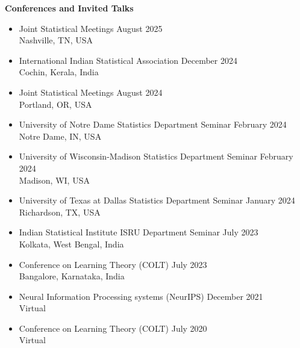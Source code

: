 \documentclass[letterpaper,12pt,oneside]{article}
\theoremstyle{definition}
\begin{document}
			
			\noindent \textbf{Conferences and Invited Talks}
			\begin{itemize}
				
				\item[] Joint Statistical Meetings
				\hfill August 2025\\
				Nashville, TN, USA 
				
				\item[] International Indian Statistical Association
				\hfill December 2024\\
				Cochin, Kerala, India
				
				\item[] Joint Statistical Meetings
				\hfill August 2024\\
				Portland, OR, USA 
				
				\item[] University of Notre Dame Statistics Department Seminar
				\hfill February 2024\\
				Notre Dame, IN, USA
				
				\item[] University of Wisconsin-Madison Statistics Department Seminar
				\hfill February 2024\\
				Madison, WI, USA
				
				\item[] University of Texas at Dallas Statistics Department Seminar
				\hfill January 2024\\
				Richardson, TX, USA
				
				\item[] Indian Statistical Institute ISRU Department Seminar \hfill July 2023\\
				Kolkata, West Bengal, India
				
				\item[] Conference on Learning Theory (COLT) \hfill July 2023\\
				Bangalore, Karnataka, India
				
				\item[] Neural Information Processing systems (NeurIPS) \hfill December 2021\\
				Virtual
				
				\item[] Conference on Learning Theory (COLT) \hfill July 2020\\
				Virtual
				
			\end{itemize}
			
\end{document}
